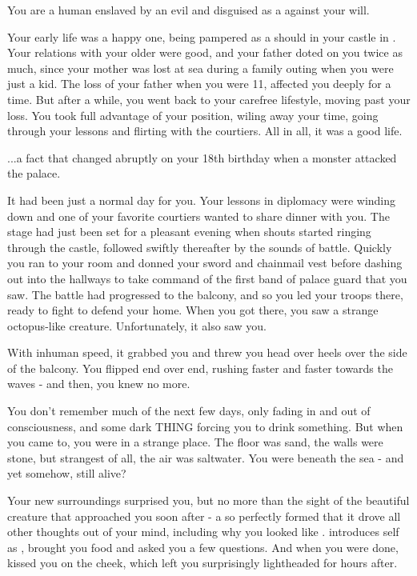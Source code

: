 \documentclass[char]{NeptuneBall}
\begin{document}
\name{\cSlave{}}



You are a human \cSlave{\Prince} enslaved by an evil \cWitch{\magician} and disguised as a \cSlave{\mer} against your will.

Your early life was a happy one, being pampered as a \cSlave{\prince} should in your castle in \pAmerica{}. Your relations with your older \cEric{\sibling} were good, and your father doted on you twice as much, since your mother was lost at sea during a family outing when you were just a kid. The loss of your father when you were 11, affected you deeply for a time. But after a while, you went back to your carefree lifestyle, moving past your loss. You took full advantage of your position, wiling away your time, going through your lessons and flirting with the courtiers. All in all, it was a good life.

...a fact that changed abruptly on your 18th birthday when a monster attacked the palace.

It had been just a normal day for you. Your lessons in diplomacy were winding down and one of your favorite courtiers wanted to share dinner with you. The stage had just been set for a pleasant evening when shouts started ringing through the castle, followed swiftly thereafter by the sounds of battle. Quickly you ran to your room and donned your sword and chainmail vest before dashing out into the hallways to take command of the first band of palace guard that you saw. The battle had progressed to the balcony, and so you led your troops there, ready to fight to defend your home. When you got there, you saw a strange octopus-like creature. Unfortunately, it also saw you.

With inhuman speed, it grabbed you and threw you head over heels over the side of the balcony. You flipped end over end, rushing faster and faster towards the waves - and then, you knew no more.

You don't remember much of the next few days, only fading in and out of consciousness, and some dark THING forcing you to drink something. But when you came to, you were in a strange place. The floor was sand, the walls were stone, but strangest of all, the air was saltwater. You were beneath the sea - and yet somehow, still alive?

Your new surroundings surprised you, but no more than the sight of the beautiful creature that approached you soon after - a \cWitch{\mer} so perfectly formed that it drove all other thoughts out of your mind, including why you looked like \cWitch{\them}. \cWitch{\They} introduces \cWitch{\their}self as \cWitch{}, brought you food and asked you a few questions. And when you were done, \cWitch{\they} kissed you on the cheek, which left you surprisingly lightheaded for hours after.
\end{document}
